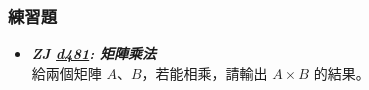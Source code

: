 \subsubsection*{練習題}
\begin{itemize}[label={\Checkmark}]
\item \textbf{\textit{ZJ \href{http://zerojudge.tw/ShowProblem?problemid=d481}{d481}: 矩陣乘法}}\\
給兩個矩陣 $A$、$B$，若能相乘，請輸出 $A\times{B}$ 的結果。
\end{itemize}